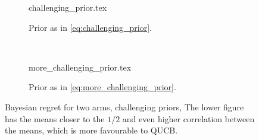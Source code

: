 \begin{figure}
    \centering
    \begin{subfigure}{\textwidth}
        \centering
        \newcommand{\myoptions}{
            width=10cm,
            height=8cm,
            xlabel={Turn},
            ylabel={Regret},
            legend entries={UCB, QUCB, Thompson},
            legend pos=north west,
            legend cell align=left,
            mystyle,
            largexnumbers,
            ymax = 400,
        }
        {challenging_prior.tex}
        \caption{
            Prior as in \cref{eq:challenging_prior}.
        }
        \label{fig:random2}
    \end{subfigure}
    \\[3ex]
    \begin{subfigure}{\textwidth}
        \centering
        \newcommand{\myoptions}{
            width=10cm,
            height=8cm,
            xlabel={Turn},
            ylabel={Regret},
            legend entries={UCB, QUCB, Thompson},
            legend pos=north west,
            legend cell align=left,
            mystyle,
            largexnumbers,
        }
        {more_challenging_prior.tex}
        \caption{
            Prior as in \cref{eq:more_challenging_prior}.
        }
        \label{fig:random3}
    \end{subfigure}
    \caption[
        Bayesian regret for two arms, challenging priors.
    ]
    {
        Bayesian regret for two arms, challenging priors,
        The lower figure has the means closer to the $1/2$ and even higher correlation between the means, which is more favourable to QUCB.
    }
    \label{fig:random_challenging}
\end{figure}